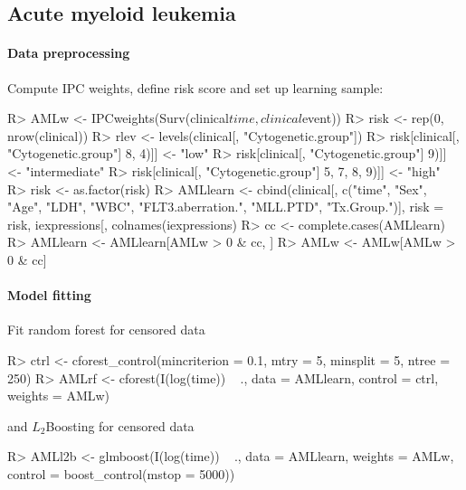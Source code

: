\documentclass{article}
\newenvironment{Schunk}{}{}
\begin{document}
\subsection{Acute myeloid leukemia}


\paragraph{Data preprocessing}

Compute IPC weights, define risk score and set up learning sample:
\begin{Schunk}
\begin{Sinput}
R> AMLw <- IPCweights(Surv(clinical$time, clinical$event))
R> risk <- rep(0, nrow(clinical))
R> rlev <- levels(clinical[, "Cytogenetic.group"])
R> risk[clinical[, "Cytogenetic.group"] %
         8, 4)]] <- "low"
R> risk[clinical[, "Cytogenetic.group"] %
         9)]] <- "intermediate"
R> risk[clinical[, "Cytogenetic.group"] %
         5, 7, 8, 9)]] <- "high"
R> risk <- as.factor(risk)
R> AMLlearn <- cbind(clinical[, c("time", "Sex", 
         "Age", "LDH", "WBC", "FLT3.aberration.", "MLL.PTD", 
         "Tx.Group.")], risk = risk, iexpressions[, 
         colnames(iexpressions) %
R> cc <- complete.cases(AMLlearn)
R> AMLlearn <- AMLlearn[AMLw > 0 & cc, ]
R> AMLw <- AMLw[AMLw > 0 & cc]
\end{Sinput}
\end{Schunk}

\paragraph{Model fitting}

Fit random forest for censored data
\begin{Schunk}
\begin{Sinput}
R> ctrl <- cforest_control(mincriterion = 0.1, mtry = 5, 
         minsplit = 5, ntree = 250)
R> AMLrf <- cforest(I(log(time)) ~ ., data = AMLlearn, 
         control = ctrl, weights = AMLw)
\end{Sinput}
\end{Schunk}
and $L_2$Boosting for censored data
\begin{Schunk}
\begin{Sinput}
R> AMLl2b <- glmboost(I(log(time)) ~ ., data = AMLlearn, 
         weights = AMLw, control = boost_control(mstop = 5000))
\end{Sinput}
\end{Schunk}
\end{document}
